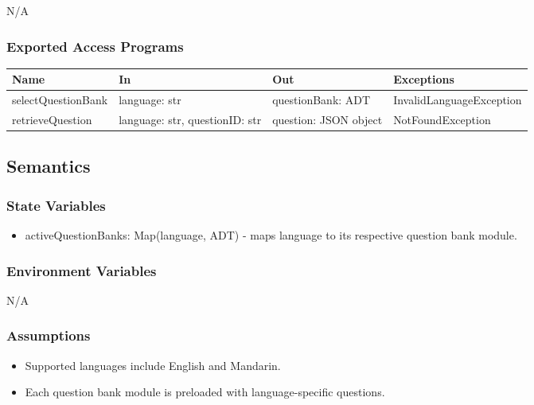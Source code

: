 \documentclass[12pt, titlepage]{article}
\begin{document}
N/A

\subsubsection{Exported Access Programs}

\begin{center}
\begin{tabular}{p{4cm} p{3cm} p{4cm} p{5cm}}
\hline
\textbf{Name} & \textbf{In} & \textbf{Out} & \textbf{Exceptions} \\
\hline
selectQuestionBank & \raggedright\arraybackslash language: str & \raggedright\arraybackslash questionBank: ADT & \raggedright\arraybackslash InvalidLanguageException \\
\hline
retrieveQuestion & \raggedright\arraybackslash language: str, questionID: str & \raggedright\arraybackslash question: JSON object & \raggedright\arraybackslash NotFoundException \\
\hline
\end{tabular}
\end{center}

\subsection{Semantics}

\subsubsection{State Variables}

\begin{itemize}
  \item activeQuestionBanks: Map(language, ADT) - maps language to its respective question bank module.
\end{itemize}

\subsubsection{Environment Variables}

N/A

\subsubsection{Assumptions}

\begin{itemize}
  \item Supported languages include English and Mandarin.
  \item Each question bank module is preloaded with language-specific questions.
\end{itemize}
\end{document}
